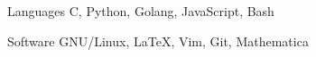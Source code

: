 
\begin{cvskills}
  \cvskill
    {Languages} %
    {C, Python, Golang, JavaScript, Bash} %

  \cvskill
    {Software} %
    {GNU/Linux, LaTeX, Vim, Git, Mathematica} %
\end{cvskills}

